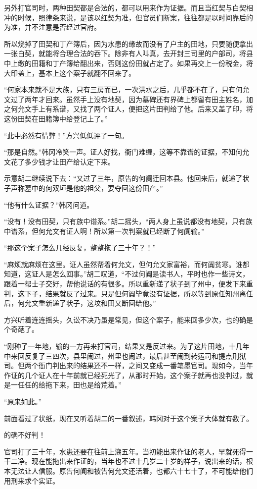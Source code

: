 另外打官司时，两种田契都是合法的，都可以用来作为证据。而且当红契与白契相冲的时候，照律条来说，是该以红契为准，但官员们断案，往往都是以时间靠后的为准，并不注意是否经过官府。

所以烧掉了田契和丁产簿后，因为水患的缘故而没有了户主的田地，只要随便拿出一张白契，就能将合理合法的吞下。除非有人叫真，去开封三司里的户部司，将县中上缴的田籍和丁产簿给翻出来，否则这份田就占定了。如果再交上一份税金，将大印盖上，基本上这个案子就翻不回来了。

“何家本来就不是大族，只有三房而已，一次洪水之后，几乎都不在了，只有何允文过了两年才回来。虽然手上没有地契，因为墓碑还有界碑上都留有田主姓名，加之何允文手上有系谱，又找了两个证人，便把这片田判给了他。后来又盖了印，将这份田契在田籍簿中给登记上了。”

“此中必然有情弊！”方兴低低评了一句。

“那是自然。”韩冈冷笑一声。证人好找，衙门难缠，这等不靠谱的证据，不知何允文花了多少钱才让田产给认定下来。

示意胡二继续说下去：“又过了三年，原告的何阗迁回本县。他回来后，就递了状子声称墓中的何双垣是他的祖父，要夺回这份田产。”

“他有什么证据？”韩冈问道。

“没有！没有田契，只有族中谱系。”胡二摇头，“两人身上虽说都没有地契，只有族中谱系，但何允文有证人啊！所以第一次判案就已经断了何阗输。”

“那这个案子怎么几经反复，整整拖了三十年？！”

“麻烦就麻烦在这里。证人虽然帮着何允文，但何允文家富裕，而何阗贫寒。谁都知道，这证人是怎么回事。”胡二叹道，“不过何阗是读书人，平时也作一些诗文，跟着一帮士子交好，帮他说话的有很多。所以重新递了状子到了州中，便发下来重判，这下子，结果就反了过来。只是但何阗毕竟没有证据，所以等到原任知州离任后，何允文重新递了状子，这坟和田又断回给他。”

方兴听着连连摇头，久讼不决乃虽是常见，但这个案子，能来回多少次，也的确是个奇葩了。

“刚种了一年地，输的一方再来打官司，结果又是反过来。为了这片田地，十几年中来回反复了三四次，县里闹过，州里也闹过，最后甚至闹到转运司和提点刑狱司。但两个衙门判出来的结果还不一样，之间又变成一番笔墨官司。现如今，当年作证的几个证人在十年前就已经死光了，从那时开始，这个案子就再也没判过，就是一任任的给拖下来，田也是给荒着。”

“原来如此。”

前面看过了状纸，现在又听着胡二的一番叙述，韩冈对于这个案子大体就有数了。

的确不好判！

官司打了三十年，水患还要在往前上溯五年。当初能出来作证的老人，早就死得一干二净。现在能拖出来作证的，当年也不过十几岁二十岁的样子，说出来的话，根本无法让人信服。原告何阗和被告何允文还活着，也都六十七十了，不可能给他们用刑来求个实证。

